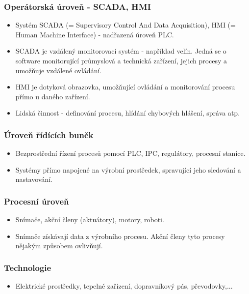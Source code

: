 \subsubsection*{Operátorská úroveň - SCADA, HMI}
\begin{itemize}
    \item Systém SCADA (= Supervisory Control And Data Acquisition), HMI (= Human Machine Interface) - nadřazená úroveň PLC.
    \item SCADA je vzdálený monitorovací systém - například velín. Jedná se o software monitorující průmyslová a technická zařízení, jejich procesy a umožňuje vzdálené ovládání.
    \item HMI je dotyková obrazovka, umožňující ovládání a monitorování procesu přímo u daného zařízení.
    \item Lidská činnost - definování procesu, hlídání chybových hlášení, správa atp.
\end{itemize}

\subsubsection*{Úroveň řídících buněk}
\begin{itemize}
    \item Bezprostřední řízení procesů pomocí PLC, IPC, regulátory, procesní stanice.
    \item Systémy přímo napojené na výrobní prostředek, spravující jeho sledování a nastavování.
\end{itemize}

\subsubsection*{Procesní úroveň}
\begin{itemize}
    \item Snímače, akční členy (aktuátory), motory, roboti.
    \item Snímače získávají data z výrobního procesu. Akční členy tyto procesy nějakým způsobem ovlivňují.
\end{itemize}

\subsubsection*{Technologie}
\begin{itemize}
    \item Elektrické prostředky, tepelné zařízení, dopravníkový pás, převodovky,...
\end{itemize}

